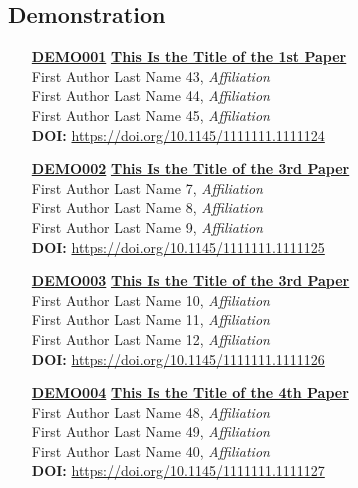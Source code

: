 \subsection{Demonstration}
\begin{enumerate}
\item[\href{https://doi.org/10.1145/1111111.1111124}{\textbf{DEMO001}}]
\href{https://doi.org/10.1145/1111111.1111124}{\textbf{This Is the Title of the 1st Paper}}\\
First Author Last Name 43, \emph{Affiliation}\\
First Author Last Name 44, \emph{Affiliation}\\
First Author Last Name 45, \emph{Affiliation}\\
\textbf{DOI:} \href{https://doi.org/10.1145/1111111.1111124}{https://doi.org/10.1145/1111111.1111124}\\

\item[\href{https://doi.org/10.1145/1111111.1111125}{\textbf{DEMO002}}]
\href{https://doi.org/10.1145/1111111.1111125}{\textbf{This Is the Title of the 3rd Paper}}\\
First Author Last Name 7, \emph{Affiliation}\\
First Author Last Name 8, \emph{Affiliation}\\
First Author Last Name 9, \emph{Affiliation}\\
\textbf{DOI:} \href{https://doi.org/10.1145/1111111.1111125}{https://doi.org/10.1145/1111111.1111125}\\

\item[\href{https://doi.org/10.1145/1111111.1111126}{\textbf{DEMO003}}]
\href{https://doi.org/10.1145/1111111.1111126}{\textbf{This Is the Title of the 3rd Paper}}\\
First Author Last Name 10, \emph{Affiliation}\\
First Author Last Name 11, \emph{Affiliation}\\
First Author Last Name 12, \emph{Affiliation}\\
\textbf{DOI:} \href{https://doi.org/10.1145/1111111.1111126}{https://doi.org/10.1145/1111111.1111126}\\

\item[\href{https://doi.org/10.1145/1111111.1111127}{\textbf{DEMO004}}]
\href{https://doi.org/10.1145/1111111.1111127}{\textbf{This Is the Title of the 4th Paper}}\\
First Author Last Name 48, \emph{Affiliation}\\
First Author Last Name 49, \emph{Affiliation}\\
First Author Last Name 40, \emph{Affiliation}\\
\textbf{DOI:} \href{https://doi.org/10.1145/1111111.1111127}{https://doi.org/10.1145/1111111.1111127}\\
\end{enumerate}


